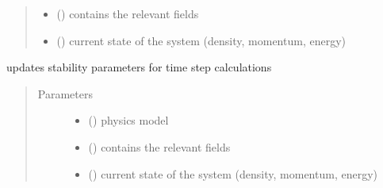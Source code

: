 \documentclass[letterpaper,10pt,english]{sphinxmanual}
\begin{document}
\begin{fulllineitems}
\begin{fulllineitems}
\begin{quote}
\begin{description}
\begin{itemize}
\item {} 
\sphinxAtStartPar
{} ({\hyperref[\detokenize{autoapi/Workspace/index:Workspace.Workspace}]{}}) \textendash{} contains the relevant fields

\item {} 
\sphinxAtStartPar
{} ({\hyperref[\detokenize{autoapi/Field/index:Field.Field}]{}}) \textendash{} current state of the system (density, momentum, energy)

\end{itemize}

\end{description}\end{quote}

\end{fulllineitems}


\begin{fulllineitems}
\label{\detokenize{autoapi/NS_Airfoil/index:NS_Airfoil.NS_Airfoil.update_stability}}
\sphinxAtStartPar
updates stability parameters for time step calculations
\begin{quote}\begin{description}
\item[{Parameters}] \leavevmode\begin{itemize}
\item {} 
\sphinxAtStartPar
{} ({\hyperref[\detokenize{autoapi/NavierStokes/index:NavierStokes.NavierStokes}]{}}) \textendash{} physics model

\item {} 
\sphinxAtStartPar
{} ({\hyperref[\detokenize{autoapi/Workspace/index:Workspace.Workspace}]{}}) \textendash{} contains the relevant fields

\item {} 
\sphinxAtStartPar
{} ({\hyperref[\detokenize{autoapi/Field/index:Field.Field}]{}}) \textendash{} current state of the system (density, momentum, energy)


\end{itemize}
\end{description}
\end{quote}
\end{fulllineitems}
\end{fulllineitems}
\end{document}
